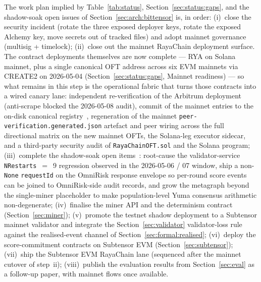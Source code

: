 \documentclass[11pt,a4paper]{article}
\begin{document}
The work plan implied by Table~\ref{tab:status}, Section~\ref{sec:status:gaps},
and the shadow-soak open issues of Section~\ref{sec:arch:bittensor} is, in order:
(i)~close the security incident (rotate the three exposed deployer keys, rotate
the exposed Alchemy key, move secrets out of tracked files) and adopt mainnet
governance (multisig + timelock);
(ii)~close out the mainnet RayaChain deployment surface. The contract
deployments themselves are now complete --- RYA on Solana mainnet, plus a
single canonical OFT address across six EVM mainnets via CREATE2 on
2026-05-04 (Section~\ref{sec:status:gaps}, Mainnet readiness) --- so what
remains in this step is the operational fabric that turns those contracts
into a wired canary lane: independent re-verification of the Arbitrum
deployment (anti-scrape blocked the 2026-05-08 audit), commit of the
mainnet entries to the on-disk canonical
registry~\cite{rayachain2026registry}, regeneration of the mainnet
\texttt{peer-verification.generated.json} artefact and peer wiring across
the full directional matrix on the new mainnet OFTs, the Solana-leg
executor sidecar, and a third-party security audit of
\texttt{RayaChainOFT.sol} and the Solana program;
(iii)~complete the shadow-soak open items~\cite{omnirisk2026soak}: root-cause the
validator-service \texttt{NRestarts}~$=$~9 regression observed in the
2026-05-06 / 07 window, ship a non-\texttt{None} \texttt{requestId} on the
OmniRisk response envelope so per-round score events can be joined to OmniRisk-side
audit records, and grow the metagraph beyond the single-miner placeholder to make
population-level Yuma consensus arithmetic non-degenerate;
(iv)~finalise the miner API and the determinism contract (Section~\ref{sec:miner});
(v)~promote the testnet shadow deployment to a Subtensor mainnet validator and
integrate the Section~\ref{sec:validator} validator-loss rule against the
realised-event channel of Section~\ref{sec:formal:realised};
(vi)~deploy the score-commitment contracts on Subtensor EVM (Section~\ref{sec:subtensor});
(vii)~ship the Subtensor EVM RayaChain lane (sequenced after the mainnet cutover
of step~ii);
(viii)~publish the evaluation results from Section~\ref{sec:eval} as a follow-up
paper, with mainnet flows once available.
\end{document}
